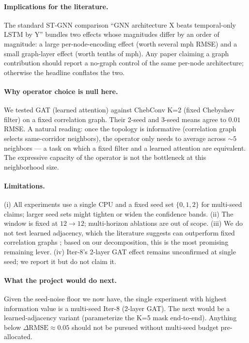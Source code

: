 \documentclass{article}
\begin{document}
\paragraph{Implications for the literature.}
The standard ST-GNN comparison ``GNN architecture X beats temporal-only LSTM by Y'' bundles two effects whose magnitudes differ by an order of magnitude: a large per-node-encoding effect (worth several mph RMSE) and a small graph-layer effect (worth tenths of mph). Any paper claiming a graph contribution should report a no-graph control of the same per-node architecture; otherwise the headline conflates the two.

\paragraph{Why operator choice is null here.}
We tested GAT (learned attention) against ChebConv K=2 (fixed Chebyshev filter) on a fixed correlation graph. Their 2-seed and 3-seed means agree to $0.01$ RMSE. A natural reading: once the topology is informative (correlation graph selects same-corridor neighbors), the operator only needs to average across $\sim 5$ neighbors --- a task on which a fixed filter and a learned attention are equivalent. The expressive capacity of the operator is not the bottleneck at this neighborhood size.

\paragraph{Limitations.}
(i) All experiments use a single CPU and a fixed seed set $\{0, 1, 2\}$ for multi-seed claims; larger seed sets might tighten or widen the confidence bands. (ii) The window is fixed at $12 \to 12$; multi-horizon ablations are out of scope. (iii) We do not test learned adjacency, which the literature suggests can outperform fixed correlation graphs \cite{wu2019graphwavenet}; based on our decomposition, this is the most promising remaining lever. (iv) Iter-8's 2-layer GAT effect remains unconfirmed at single seed; we report it but do not claim it.

\paragraph{What the project would do next.}
Given the seed-noise floor we now have, the single experiment with highest information value is a multi-seed Iter-8 (2-layer GAT). The next would be a learned-adjacency variant (parameterize the K=5 mask end-to-end). Anything below $\Delta\mathrm{RMSE} \approx 0.05$ should not be pursued without multi-seed budget pre-allocated.
\end{document}
